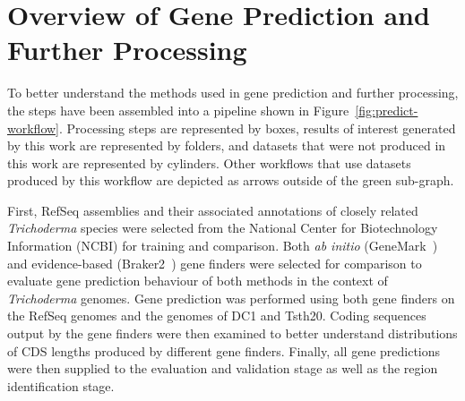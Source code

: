 



\section{Overview of Gene Prediction and Further Processing}
\label{met:predict-workflow}

To better understand the methods used in gene prediction and further processing, the steps have been assembled into a pipeline shown in Figure~\ref{fig:predict-workflow}. Processing steps are represented by boxes,
results of interest generated by this work are represented by folders,
and datasets that were not produced in this work are represented by
cylinders. Other workflows that use datasets produced by this workflow
are depicted as arrows outside of the green sub-graph.

First, RefSeq assemblies and their associated annotations of closely
related \textit{Trichoderma} species were selected from the National Center for Biotechnology Information (NCBI) for
training and comparison. Both \textit{ab initio}
(GeneMark~\cite{borodovsky2011a}) and evidence-based
(Braker2~\cite{bruna2021a}) gene finders were selected for comparison to
evaluate gene prediction behaviour of both methods in the context of
\textit{Trichoderma} genomes. Gene prediction was performed using both
gene finders on the RefSeq genomes and the genomes of DC1 and
Tsth20. Coding sequences output by the gene finders were then
examined to better understand distributions of CDS lengths produced by
different gene finders. Finally, all gene predictions were then
supplied to the evaluation and validation stage as well as the region
identification stage.

